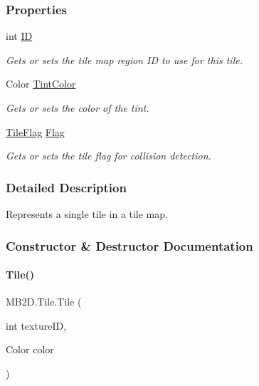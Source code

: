 \subsubsection*{Properties}
\begin{DoxyCompactItemize}
\item 
int \hyperlink{class_m_b2_d_1_1_tile_a4b10263cc9eeca4a37043c6d99d81ace}{ID}
\begin{DoxyCompactList}\small\item\em Gets or sets the tile map region ID to use for this tile. \end{DoxyCompactList}\item 
Color \hyperlink{class_m_b2_d_1_1_tile_aec3aa2408ecc89cc40095f22b907eaa5}{Tint\+Color}
\begin{DoxyCompactList}\small\item\em Gets or sets the color of the tint. \end{DoxyCompactList}\item 
\hyperlink{namespace_m_b2_d_a3ff821c2c17b424864d890d0b26536ea}{Tile\+Flag} \hyperlink{class_m_b2_d_1_1_tile_a46c14f1195c382dc033a26fa7ad407eb}{Flag}
\begin{DoxyCompactList}\small\item\em Gets or sets the tile flag for collision detection. \end{DoxyCompactList}\end{DoxyCompactItemize}


\subsubsection{Detailed Description}
Represents a single tile in a tile map. 



\subsubsection{Constructor \& Destructor Documentation}
\hypertarget{class_m_b2_d_1_1_tile_ab9e2260dc2c752c36a248660d99b0e34}{}\label{class_m_b2_d_1_1_tile_ab9e2260dc2c752c36a248660d99b0e34} 
\paragraph{\texorpdfstring{Tile()}{Tile()}\hspace{0.1cm}{\footnotesize\ttfamily [1/2]}}
{\footnotesize\ttfamily M\+B2\+D.\+Tile.\+Tile (\begin{DoxyParamCaption}\item[{int}]{texture\+ID,  }\item[{Color}]{color }\end{DoxyParamCaption})\hspace{0.3cm}{\ttfamily [inline]}}



